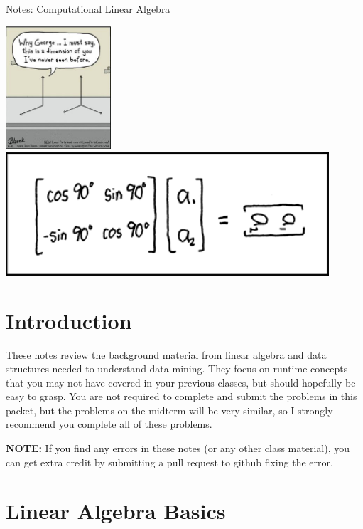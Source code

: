 \documentclass[10pt]{article}
\theoremstyle{definition}
\begin{document}
\begin{center}
{
\Huge
Notes: Computational Linear Algebra
}

\vspace{0.15in}
\end{center}

\begin{center}
\includegraphics[height=1.8in]{comic}
\includegraphics[height=1.8in]{matrix_transform}
\end{center}


\section{Introduction}

These notes review the background material from linear algebra and data structures needed to understand data mining.
They focus on runtime concepts that you may not have covered in your previous classes,
but should hopefully be easy to grasp.
You are not required to complete and submit the problems in this packet,
but the problems on the midterm will be very similar,
so I strongly recommend you complete all of these problems.

\textbf{NOTE:}
If you find any errors in these notes (or any other class material),
you can get extra credit by submitting a pull request to github fixing the error.

\section{Linear Algebra Basics}
\end{document}
